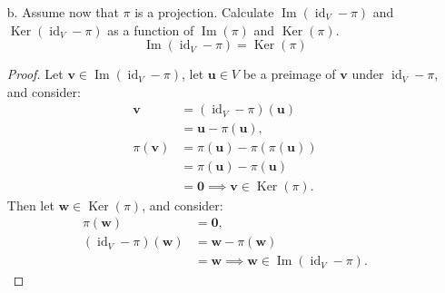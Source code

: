 \documentclass[11pt]{article}
\newcommand{\vect}[1]{\bm{#1}}      %
\DeclareMathOperator{\Ker}{Ker}
\DeclareMathOperator{\Img}{Im}
\DeclareMathOperator{\id}{id}
\theoremstyle{definition}
\theoremstyle{plain}
\theoremstyle{remark}
\begin{document}
\begin{enumerate}
\begin{enumerate}
                    \begin{proof}
                        Define $\rho = \id_V - \pi$.  Then
                        \[
                            \rho^2 = \id_V - 2 \pi + \pi^2.
                        \]
                        \[
                            \rho^2 = \rho
                            \begin{aligned}
                                 & \quad \iff \quad
                                \id_V - 2 \pi + \pi^2 = \id_V - \pi \\
                                 & \quad \iff \quad
                                \pi^2 = \pi                         \\
                            \end{aligned}
                        \]
                    \end{proof}

              \item[b.] Assume now that $\pi$ is a projection.  Calculate $\Img(\id_V - \pi)$ and $\Ker(\id_V
                        - \pi)$ as a function of $\Img(\pi)$ and $\Ker(\pi)$.
                    \[
                        \Img(\id_V - \pi) = \Ker(\pi)
                    \]
                    \begin{proof}
                        Let $\vect{v} \in \Img(\id_V - \pi)$, let $\vect{u} \in V$ be a preimage of $\vect{v}$ under $\id_V - \pi$, and consider:
                        \[
                            \begin{aligned}
                                \vect{v}      & = (\id_V - \pi)(\vect{u})                   \\
                                              & = \vect{u} - \pi(\vect{u}),                 \\
                                \pi(\vect{v}) & = \pi(\vect{u}) - \pi(\pi(\vect{u}))        \\
                                              & = \pi(\vect{u}) - \pi(\vect{u})             \\
                                              & = \vect{0} \implies \vect{v} \in \Ker(\pi).
                            \end{aligned}
                        \]
                        Then let $\vect{w} \in \Ker(\pi)$, and consider:
                        \[
                            \begin{aligned}
                                \pi(\vect{w})           & = \vect{0},                                         \\
                                (\id_V - \pi)(\vect{w}) & = \vect{w} - \pi(\vect{w})                          \\
                                                        & = \vect{w} \implies \vect{w} \in \Img(\id_V - \pi).
                            \end{aligned}
                        \]
                    \end{proof}


\end{enumerate}
\end{enumerate}
\end{document}
